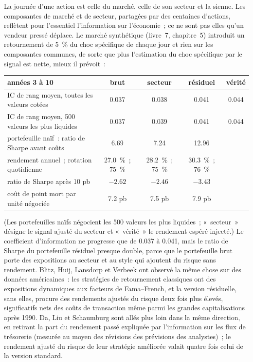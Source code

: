 La journée d'une action est celle du marché, celle de son secteur et la sienne. Les composantes de marché et de secteur, partagées par des centaines d'actions, reflètent pour l'essentiel
l'information sur l'économie~; ce ne sont pas elles qu'un vendeur pressé déplace. Le marché synthétique (livre~7, chapitre~5) introduit un retournement de 5~\% du choc spécifique de chaque jour et
rien sur les composantes communes, de sorte que plus l'estimation du choc spécifique par le signal est nette, mieux il prévoit~:

\begin{center}
\small
\begin{tabular}{@{}lcccc@{}}
\toprule
années 3 à 10 & brut & secteur & résiduel & vérité\\
\midrule
IC de rang moyen, toutes les valeurs cotées & 0.037 & 0.038 & 0.041 & 0.044\\
IC de rang moyen, 500 valeurs les plus liquides & 0.037 & 0.039 & 0.041 & 0.044\\
\midrule
portefeuille naïf~: ratio de Sharpe avant coûts & 6.69 & 7.24 & 12.96 & \\
rendement annuel~; rotation quotidienne & 27.0~\%~; 75~\% & 28.2~\%~; 75~\% & 30.3~\%~; 76~\% & \\
ratio de Sharpe après 10 pb & $-2.62$ & $-2.46$ & $-3.43$ & \\
coût de point mort par unité négociée & 7.2 pb & 7.5 pb & 7.9 pb & \\
\bottomrule
\end{tabular}
\end{center}

(Les portefeuilles naïfs négocient les 500 valeurs les plus liquides~; «~secteur~» désigne le signal ajusté du secteur et «~vérité~» le
rendement espéré injecté.) Le coefficient d'information ne progresse que de 0.037 à 0.041, mais le ratio de Sharpe du portefeuille résiduel presque double, parce que le portefeuille brut porte
des expositions au secteur et au style qui ajoutent du risque sans rendement. Blitz, Huij, Lansdorp et Verbeek ont observé la même chose sur des données américaines~: les stratégies de retournement classiques ont des
expositions dynamiques aux facteurs de Fama--French, et la version résiduelle, sans elles, procure des rendements ajustés du risque deux fois plus élevés, significatifs nets des coûts de transaction
même parmi les grandes capitalisations après 1990. Da, Liu et Schaumburg sont allés plus loin dans la même direction, en retirant la part du rendement passé expliquée par l'information sur les flux de trésorerie
(mesurée au moyen des révisions des prévisions des analystes)~; le rendement ajusté du risque de leur stratégie améliorée valait quatre fois celui de la version standard.

